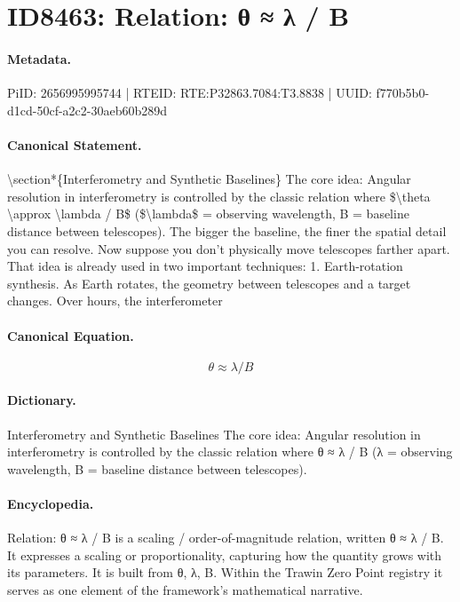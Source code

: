 \section*{ID8463: Relation: θ ≈ λ / B}
\paragraph{Metadata.}
PiID: 2656995995744 | RTEID: RTE:P32863.7084:T3.8838 | UUID: f770b5b0-d1cd-50cf-a2c2-30aeb60b289d

\paragraph{Canonical Statement.}
\textbackslash{}section*\{Interferometry and Synthetic Baselines\} The core idea: Angular resolution in interferometry is controlled by the classic relation where \$\textbackslash{}theta \textbackslash{}approx \textbackslash{}lambda / B\$ (\$\textbackslash{}lambda\$ = observing wavelength, B = baseline distance between telescopes). The bigger the baseline, the finer the spatial detail you can resolve. Now suppose you don’t physically move telescopes farther apart. That idea is already used in two important techniques: 1. Earth-rotation synthesis. As Earth rotates, the geometry between telescopes and a target changes. Over hours, the interferometer

\paragraph{Canonical Equation.}
\[
\theta \approx \lambda / B
\]

\paragraph{Dictionary.}
Interferometry and Synthetic Baselines The core idea: Angular resolution in interferometry is controlled by the classic relation where θ ≈ λ / B (λ = observing wavelength, B = baseline distance between telescopes).

\paragraph{Encyclopedia.}
Relation: θ ≈ λ / B is a scaling / order-of-magnitude relation, written θ ≈ λ / B. It expresses a scaling or proportionality, capturing how the quantity grows with its parameters. It is built from θ, λ, B. Within the Trawin Zero Point registry it serves as one element of the framework's mathematical narrative.
